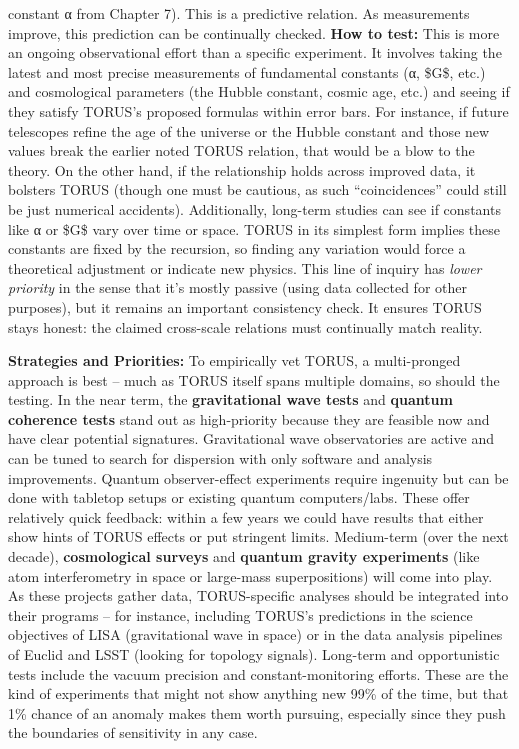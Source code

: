\documentclass[]{article}
\begin{document}
\begin{itemize}
  constant α from Chapter 7). This is a predictive relation. As
  measurements improve, this prediction can be continually checked.
  \textbf{How to test:} This is more an ongoing observational effort
  than a specific experiment. It involves taking the latest and most
  precise measurements of fundamental constants (α, \$G\$, etc.) and
  cosmological parameters (the Hubble constant, cosmic age, etc.) and
  seeing if they satisfy TORUS's proposed formulas within error bars​.
  For instance, if future telescopes refine the age of the universe or
  the Hubble constant and those new values break the earlier noted TORUS
  relation, that would be a blow to the theory. On the other hand, if
  the relationship holds across improved data, it bolsters TORUS (though
  one must be cautious, as such ``coincidences'' could still be just
  numerical accidents). Additionally, long-term studies can see if
  constants like α or \$G\$ vary over time or space. TORUS in its
  simplest form implies these constants are fixed by the recursion, so
  finding any variation would force a theoretical adjustment or indicate
  new physics. This line of inquiry has \emph{lower priority} in the
  sense that it's mostly passive (using data collected for other
  purposes)​, but it remains an important consistency check. It ensures
  TORUS stays honest: the claimed cross-scale relations must continually
  match reality.
\end{itemize}

\textbf{Strategies and Priorities:} To empirically vet TORUS, a
multi-pronged approach is best -- much as TORUS itself spans multiple
domains, so should the testing. In the near term, the
\textbf{gravitational wave tests} and \textbf{quantum coherence tests}
stand out as high-priority because they are feasible now and have clear
potential signatures​. Gravitational wave observatories are active and
can be tuned to search for dispersion with only software and analysis
improvements. Quantum observer-effect experiments require ingenuity but
can be done with tabletop setups or existing quantum computers/labs.
These offer relatively quick feedback: within a few years we could have
results that either show hints of TORUS effects or put stringent limits.
Medium-term (over the next decade), \textbf{cosmological surveys} and
\textbf{quantum gravity experiments} (like atom interferometry in space
or large-mass superpositions) will come into play​. As these projects
gather data, TORUS-specific analyses should be integrated into their
programs -- for instance, including TORUS's predictions in the science
objectives of LISA (gravitational wave in space) or in the data analysis
pipelines of Euclid and LSST (looking for topology signals). Long-term
and opportunistic tests include the vacuum precision and
constant-monitoring efforts​. These are the kind of experiments that
might not show anything new 99\% of the time, but that 1\% chance of an
anomaly makes them worth pursuing, especially since they push the
boundaries of sensitivity in any case.
\end{document}
